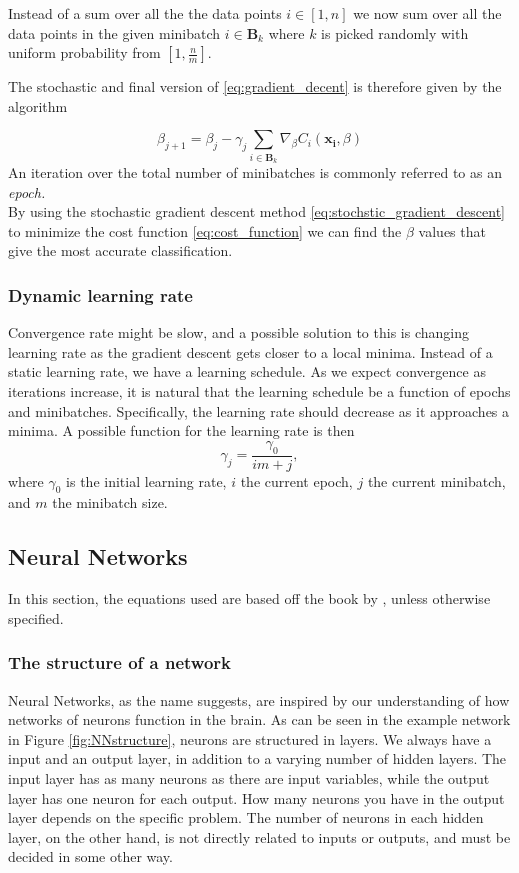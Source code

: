 Instead of a sum over all the the data points $i \in [1,n]$ we now sum over all the data points in the given minibatch $i \in \boldsymbol{B}_k$ where $k$ is picked randomly with uniform probability from $[1, \frac{n}{m}]$.

The stochastic and final version of \eqref{eq:gradient_decent} is therefore given by the algorithm

\begin{equation}
    \beta_{j+1} = \beta_j - \gamma_j \sum_{i \in \boldsymbol{B}_k}\nabla_\beta C_i(\boldsymbol{x_i},\beta)
    \label{eq:stochstic_gradient_descent}
\end{equation}
An iteration over the total number of minibatches is commonly referred to as an \textit{epoch.}\\

By using the stochastic gradient descent method \eqref{eq:stochstic_gradient_descent} to minimize the cost function \eqref{eq:cost_function} we can find the $\beta$ values that give the most accurate classification.

\subsubsection*{Dynamic learning rate}
Convergence rate might be slow, and a possible solution to this is changing learning rate as
the gradient descent gets closer to a local minima. Instead of a static learning rate, we have a learning schedule. As we expect convergence as iterations increase, it is natural that the learning schedule
be a function of epochs and minibatches. Specifically, the learning rate should decrease as it approaches a minima.
A possible function for the learning rate is then
  \begin{equation}
    \label{eq:learning_schedule}
    \gamma_{j} = \frac{\gamma_0}{im+j},
  \end{equation}
where $\gamma_{0}$ is the initial learning rate, $i$ the current epoch, $j$ the current minibatch,
and $m$ the minibatch size.

\subsection{Neural Networks}
In this section, the equations used are based off the book by \cite{Nielsen}, unless otherwise specified.
\subsubsection*{The structure of a network}
Neural Networks, as the name suggests, are inspired by our understanding of how networks of neurons function in the brain. As can be seen in the example network in Figure \ref{fig:NNstructure}, neurons are structured in layers. We always have a input and an output layer, in addition to a varying number of hidden layers. The input layer has as many neurons as there are input variables, while the output layer has one neuron for each output. How many neurons you have in the output layer depends on the specific problem. The number of neurons in each hidden layer, on the other hand, is not directly related to inputs or outputs, and must be decided in some other way.

